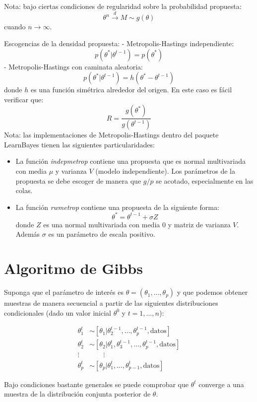 \documentclass[
  12pt,
]{book}
\theoremstyle{definition}
\theoremstyle{definition}
\theoremstyle{definition}
\theoremstyle{definition}
\theoremstyle{remark}
\begin{document}
Nota: bajo ciertas condiciones de regularidad sobre la probabilidad propuesta:
\[\theta^n \stackrel{d}{\longrightarrow} M\sim g(\theta)\]
cuando \(n\rightarrow \infty\).

Escogencias de la densidad propuesta:
- Metropolis-Hastings independiente:
\[p(\theta^*|\theta^{t-1})=p(\theta^*)\]
- Metropolis-Hastings con caminata aleatoria:
\[p(\theta^*|\theta^{t-1})=h(\theta^*-\theta^{t-1})\]
donde \(h\) es una función simétrica alrededor del origen. En este caso es fácil verificar que:
\[R=\frac{g(\theta^*)}{g(\theta^{t-1})}\]
Nota: las implementaciones de Metropolis-Hastings dentro del paquete LearnBayes tienen las siguientes particularidades:

\begin{itemize}
\item
  La función \emph{indepmetrop} contiene una propuesta que es normal multivariada con media \(\mu\) y varianza \(V\) (modelo independiente). Los parámetros de la propuesta se debe escoger de manera que \(g/p\) se acotado, especialmente en las colas.
\item
  La función \emph{rwmetrop} contiene una propuesta de la siguiente forma:
  \[\theta^*=\theta^{t-1}+\sigma Z\]
  donde \(Z\) es una normal multivariada con media 0 y matriz de varianza \(V\). Además \(\sigma\) es un parámetro de escala positivo.
\end{itemize}

\hypertarget{algoritmo-de-gibbs}{%
\section{Algoritmo de Gibbs}\label{algoritmo-de-gibbs}}

Suponga que el parámetro de interés es \(\theta=(\theta_1,\ldots,\theta_p)\) y que podemos obtener muestras de manera secuencial a partir de las siguientes distribuciones condicionales (dado un valor inicial \(\theta^0\) y \(t=1,\ldots,n\)):

\begin{align*}
\theta_1^t&\sim [\theta_1|\theta_2^{t-1},\ldots,\theta_p^{t-1},\text{datos}]\\
\theta_2^t&\sim [\theta_2|\theta_1^t,\theta_3^{t-1},\ldots,\theta_p^{t-1},\text{datos}]\\
\vdots & \qquad \vdots\\
\theta_p^t&\sim [\theta_p|\theta_1^t,\ldots,\theta_{p-1}^t,\text{datos}]
\end{align*}

Bajo condiciones bastante generales se puede comprobar que \(\theta^t\) converge a una muestra de la distribución conjunta posterior de \(\theta\).
\end{document}
